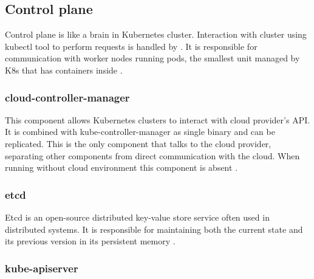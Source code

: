 


\subsection{Control plane}
\label{sec:k8s_cplane}

Control plane is like a brain in Kubernetes cluster. Interaction with cluster using kubectl tool to perform requests is handled by \textit{}. It is responsible for communication with worker nodes running pods, the smallest unit managed by K8s that has containers inside \cite{KubernetesArch}.


\subsubsection{cloud-controller-manager}
\label{sec:cloudControllerManager}

This component allows Kubernetes clusters to interact with cloud provider's API. It is combined with kube-controller-manager as single binary and can be replicated. This is the only component that talks to the cloud provider, separating other components from direct communication with the cloud. When running without cloud environment this component is absent \cite{KubernetesArch}.


\subsubsection{etcd}
\label{sec:etcd}

Etcd is an open-source distributed key-value store service often used in distributed systems. It is responsible for maintaining both the current state and its previous version in its persistent memory \cite{KubernetesArch}\cite{Etcd}.


\subsubsection{kube-apiserver}
\label{sec:kubeApiServer}

